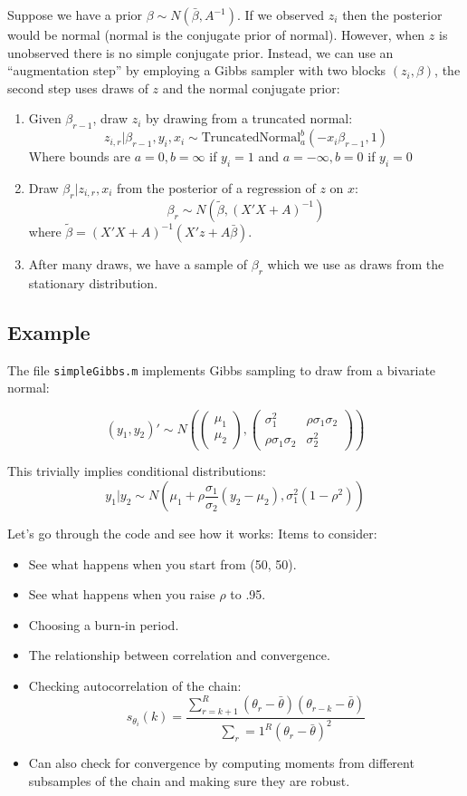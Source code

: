 \documentclass[twoside]{article}
\begin{document}
Suppose we have a prior $\beta \sim N(\bar{\beta}, A^{-1})$. If we observed $z_i$ then the posterior would be normal (normal is the conjugate prior of normal). However, when $z$ is unobserved there is no simple conjugate prior.  Instead, we can use an ``augmentation step'' by employing a Gibbs sampler with two blocks $(z_i, \beta)$, the second step uses draws of $z$ and the normal conjugate prior:

\begin{enumerate}
\item Given $\beta_{r-1}$, draw $z_i$ by drawing from a truncated normal: 
$$ z_{i, r} | \beta_{r-1}, y_i, x_i \sim \mbox{TruncatedNormal}_a^b(-x_i \beta_{r-1}, 1) $$
Where bounds are $a = 0, b = \infty$ if $y_i = 1$ and $a = -\infty, b = 0$ if $y_i = 0$
\item Draw $\beta_r | z_{i,r}, x_i$ from the posterior of a regression of $z$ on $x$:
$$\beta_r \sim N(\tilde{\beta}, (X'X + A)^{-1})$$
where $\tilde{\beta} = (X'X + A)^{-1}(X'z + A\bar{\beta})$. 
\item After many draws, we have a sample of $\beta_r$ which we use as draws from the stationary distribution. 
\end{enumerate}

\subsection{Example}

The file {\tt simpleGibbs.m} implements Gibbs sampling to draw from a bivariate normal: 

$$(y_1, y_2)' \sim N\left( \begin{pmatrix} \mu_1 \\ \mu_2 \end{pmatrix}, \begin{pmatrix} \sigma_1^2 & \rho \sigma_1 \sigma_2 \\ \rho \sigma_1 \sigma_2 & \sigma_2^2 \end{pmatrix} \right) $$

This trivially implies conditional distributions: 
$$y_1 | y_2 \sim N(\mu_1 + \rho \frac{\sigma_1}{\sigma_2}(y_2 - \mu_2), \sigma_1^2(1 - \rho^2))$$

Let's go through the code and see how it works: 
Items to consider: 
\begin{itemize}
\item See what happens when you start from (50, 50). 
\item See what happens when you raise $\rho$ to .95. 
\item Choosing a burn-in period. 
\item The relationship between correlation and convergence. 
\item Checking autocorrelation of the chain: 
$$s_{\theta_i}(k) = \frac{ \sum_{r = k+1}^R (\theta_r - \bar{\theta})(\theta_{r-k} - \bar{\theta})}{ \sum_r=1^R  (\theta_r - \bar{\theta})^2} $$
\item Can also check for convergence by computing moments from different subsamples of the chain and making sure they are robust.
\end{itemize}
\end{document}

